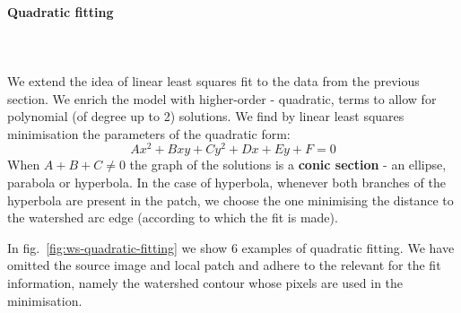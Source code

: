 \paragraph{Quadratic fitting}\mbox{}\\\mbox{}\\
We extend the idea of linear least squares fit to the data from the previous section. We enrich %
the model with higher-order - quadratic, terms to allow for polynomial (of degree up to 2) solutions. We find by linear least squares minimisation the parameters of the quadratic form: %
\[
 Ax^2+Bxy+Cy^2+Dx+Ey+F=0
\]
When $A + B + C \ne 0$ the graph of the solutions is a \textbf{conic section} - an ellipse, parabola or hyperbola. In the case of hyperbola, whenever both branches of the hyperbola are present in the patch, we choose the one minimising the distance to the watershed arc edge (according to which the fit is made).

In fig.~\ref{fig:ws-quadratic-fitting} we show 6 examples of quadratic fitting. We have omitted the source image %
and local patch and adhere to %
the relevant for the fit information, namely the watershed contour whose pixels are used in the minimisation.

